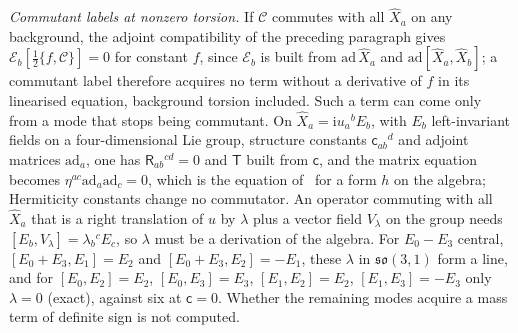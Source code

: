 \emph{Commutant labels at nonzero torsion.} If \(\mathcal C\) commutes with all \(\hat X_a\) on any background, the adjoint compatibility of the preceding paragraph gives \(\mathcal E_b[\tfrac12\{f,\mathcal C\}]=0\) for constant \(f\), since \(\mathcal E_b\) is built from \(\mathrm{ad}\,\hat X_a\) and \(\mathrm{ad}[\hat X_a,\hat X_b]\); a commutant label therefore acquires no term without a derivative of \(f\) in its linearised equation, background torsion included. Such a term can come only from a mode that stops being commutant. On \(\hat X_a=\mathrm iu_a{}^bE_b\), with \(E_b\) left-invariant fields on a four-dimensional Lie group, structure constants \(\mathsf c_{ab}{}^d\) and adjoint matrices \(\mathrm{ad}_a\), one has \(\mathsf R_{ab}{}^{cd}=0\) and \(\mathsf T\) built from \(\mathsf c\), and the matrix equation becomes \(\eta^{ac}\mathrm{ad}_a\mathrm{ad}_c=0\), which is the equation of~\cite{Liao2026} for a form \(h\) on the algebra; Hermiticity constants change no commutator. An operator commuting with all \(\hat X_a\) that is a right translation of \(u\) by \(\lambda\) plus a vector field \(V_\lambda\) on the group needs \([E_b,V_\lambda]=\lambda_b{}^cE_c\), so \(\lambda\) must be a derivation of the algebra. For \(E_0-E_3\) central, \([E_0+E_3,E_1]=E_2\) and \([E_0+E_3,E_2]=-E_1\), these \(\lambda\) in \(\mathfrak{so}(3,1)\) form a line, and for \([E_0,E_2]=E_2\), \([E_0,E_3]=E_3\), \([E_1,E_2]=E_2\), \([E_1,E_3]=-E_3\) only \(\lambda=0\) (exact), against six at \(\mathsf c=0\). Whether the remaining modes acquire a mass term of definite sign is not computed.

